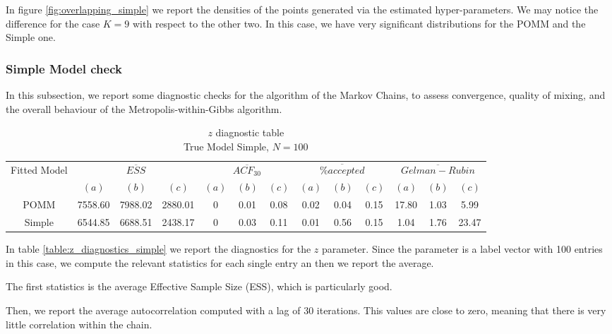 \documentclass[11pt]{amsart}
\begin{document}
In figure \eqref{fig:overlapping_simple} we report the densities of the points generated via the estimated hyper-parameters. We may notice the difference for the case $K=9$ with respect to the other two. In this case, we have very significant distributions for the POMM and the Simple one.


\clearpage




\subsubsection{Simple Model check}

In this subsection, we report some diagnostic checks for the algorithm of the Markov Chains, to assess convergence, quality of mixing, and the overall behaviour of the Metropolis-within-Gibbs algorithm.




\begin{table}[h]
\centering
\caption{
{\large $z$ diagnostic table} \\ 
{\small True Model Simple, $N=100$}
} 
\begin{tabular}{ccccccccccccc}
\toprule
\multirow{2}{*}{Fitted Model} & \multicolumn{3}{c}{$\overline{ESS}$} & \multicolumn{3}{c}{
$\overline{ACF_{30}}$} & \multicolumn{3}{c}{$\overline{\% accepted}$} & \multicolumn{3}{c}{$\overline{Gelman-Rubin}$}\\
\cmidrule(lr){2-4} \cmidrule(lr){5-7} \cmidrule(lr){8-10} \cmidrule(lr){11-13} 
& $(a)$ & $(b)$ & $(c)$ & $(a)$ & $(b)$ & $(c)$ & $(a)$ & $(b)$ & $(c)$ & $(a)$ & $(b)$ & $(c)$ \\
\midrule
POMM &7558.60 & 7988.02 & 2880.01 & 0 & 0.01 & 0.08 & 0.02 & 0.04 & 0.15 & 17.80 & 1.03 & 5.99 \\
Simple &6544.85 & 6688.51 & 2438.17 & 0 & 0.03 & 0.11 & 0.01 & 0.56 & 0.15 & 1.04 & 1.76 & 23.47   \\
\bottomrule
\end{tabular}
\label{table:z_diagnostics_simple}
\end{table}

In table \eqref{table:z_diagnostics_simple} we report the diagnostics for the $z$ parameter. Since the parameter is a label vector with 100 entries in this case, we compute the relevant statistics for each single entry an then we report the average.

The first statistics is the average Effective Sample Size (ESS), which is particularly good.

Then, we report the average autocorrelation computed with a lag of 30 iterations. This values are close to zero, meaning that there is very little correlation within the chain.
\end{document}
